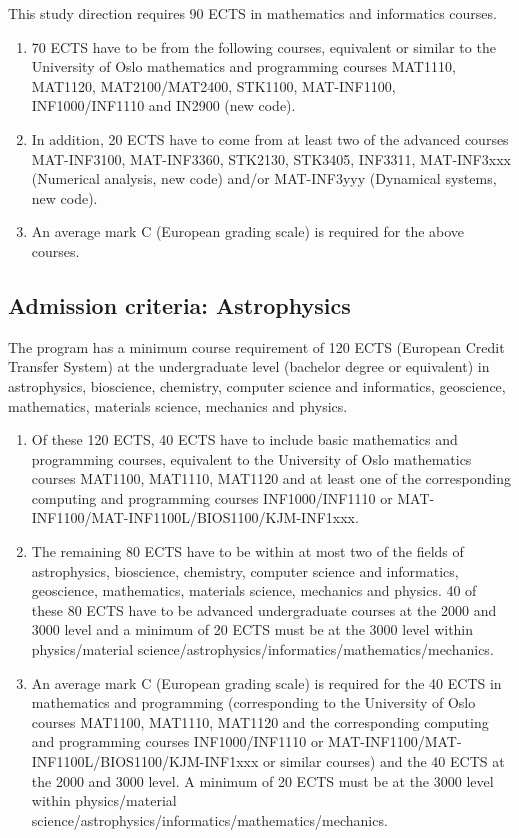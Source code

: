 \documentclass[%
oneside,                 %
final,                   %
10pt]{article}
\begin{document}
This study direction requires 90 ECTS in mathematics and informatics courses. 
\begin{enumerate}
\item 70 ECTS have to be from the following courses, equivalent or similar to the University of Oslo mathematics and programming courses MAT1110, MAT1120, MAT2100/MAT2400, STK1100, MAT-INF1100, INF1000/INF1110 and IN2900 (new code). 

\item In addition, 20 ECTS have to come from at least  two of the advanced courses MAT-INF3100, MAT-INF3360, STK2130, STK3405, INF3311, MAT-INF3xxx (Numerical analysis, new code) and/or MAT-INF3yyy (Dynamical systems, new code).

\item An average mark C (European grading scale) is required for the above courses.
\end{enumerate}

\noindent
\subsection{Admission criteria: Astrophysics}
The program has a minimum course requirement of 120 ECTS (European Credit Transfer System) at the undergraduate level (bachelor degree or equivalent) in astrophysics, bioscience, chemistry, computer science and informatics, geoscience, mathematics, materials science, mechanics and physics. 
\begin{enumerate}
\item Of these 120 ECTS, 40 ECTS have to include basic mathematics and programming courses, equivalent to the University of Oslo mathematics courses MAT1100, MAT1110, MAT1120 and at least one of the corresponding computing and programming courses INF1000/INF1110 or MAT-INF1100/MAT-INF1100L/BIOS1100/KJM-INF1xxx. 

\item The remaining 80 ECTS have to be within at most two of the fields of astrophysics, bioscience, chemistry, computer science and informatics, geoscience, mathematics, materials science, mechanics and physics. 40 of these 80 ECTS have to be advanced undergraduate courses at the 2000 and 3000 level and a minimum of 20 ECTS must be at the 3000 level within physics/material science/astrophysics/informatics/mathematics/mechanics. 

\item An average mark C (European grading scale) is required for the 40 ECTS in mathematics and programming (corresponding  to the University of Oslo courses  MAT1100, MAT1110, MAT1120  and the corresponding computing and programming courses INF1000/INF1110 or MAT-INF1100/MAT-INF1100L/BIOS1100/KJM-INF1xxx or similar courses) and the 40 ECTS at the 2000 and 3000 level. A minimum of 20 ECTS must be at the 3000 level within physics/material science/astrophysics/informatics/mathematics/mechanics. 
\end{enumerate}
\end{document}

